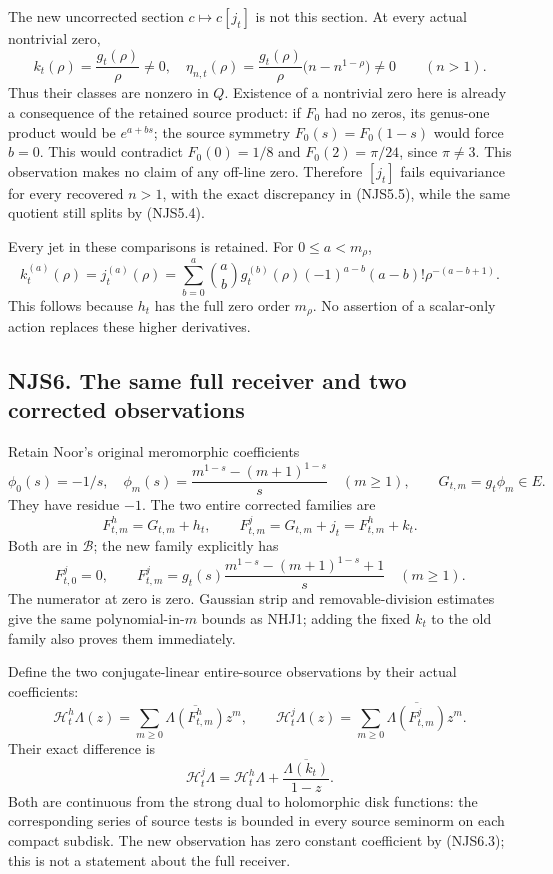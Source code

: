 The new uncorrected section \(c\mapsto c[j_t]\) is not this section. At
every actual nontrivial zero, \[
k_t(\rho)=\frac{g_t(\rho)}\rho\ne0,
\quad
\eta_{n,t}(\rho)=\frac{g_t(\rho)}\rho
\bigl(n-n^{1-\rho}\bigr)\ne0\qquad(n>1).
\tag{NJS5.5}
\] Thus their classes are nonzero in \(Q\). Existence of a nontrivial
zero here is already a consequence of the retained source product: if
\(F_0\) had no zeros, its genus-one product would be \(e^{a+bs}\); the
source symmetry \(F_0(s)=F_0(1-s)\) would force \(b=0\). This would
contradict \(F_0(0)=1/8\) and \(F_0(2)=\pi/24\), since \(\pi\ne3\). This
observation makes no claim of any off-line zero. Therefore \([j_t]\)
fails equivariance for every recovered \(n>1\), with the exact
discrepancy in (NJS5.5), while the same quotient still splits by
(NJS5.4).

Every jet in these comparisons is retained. For \(0\le a<m_\rho\), \[
k_t^{(a)}(\rho)=j_t^{(a)}(\rho)
=\sum_{b=0}^a\binom ab g_t^{(b)}(\rho)
(-1)^{a-b}(a-b)!\rho^{-(a-b+1)}.
\tag{NJS5.6}
\] This follows because \(h_t\) has the full zero order \(m_\rho\). No
assertion of a scalar-only action replaces these higher derivatives.

\subsection{NJS6. The same full receiver and two corrected
observations}\label{njs6.-the-same-full-receiver-and-two-corrected-observations}

Retain Noor's original meromorphic coefficients \[
\phi_0(s)=-1/s,\quad
\phi_m(s)=\frac{m^{1-s}-(m+1)^{1-s}}s\quad(m\ge1),
\qquad G_{t,m}=g_t\phi_m\in E.
\tag{NJS6.1}
\] They have residue \(-1\). The two entire corrected families are \[
F^h_{t,m}=G_{t,m}+h_t,
\qquad F^j_{t,m}=G_{t,m}+j_t=F^h_{t,m}+k_t.
\tag{NJS6.2}
\] Both are in \(\mathcal B\); the new family explicitly has \[
F^j_{t,0}=0,\qquad
F^j_{t,m}=g_t(s)\frac{m^{1-s}-(m+1)^{1-s}+1}s\quad(m\ge1).
\tag{NJS6.3}
\] The numerator at zero is zero. Gaussian strip and removable-division
estimates give the same polynomial-in-\(m\) bounds as NHJ1; adding the
fixed \(k_t\) to the old family also proves them immediately.

Define the two conjugate-linear entire-source observations by their
actual coefficients: \[
\mathcal H_t^h\Lambda(z)=\sum_{m\ge0}\overline{\Lambda(F^h_{t,m})}z^m,
\qquad\mathcal H_t^j\Lambda(z)=\sum_{m\ge0}\overline{\Lambda(F^j_{t,m})}z^m.
\] Their exact difference is \[
\boxed{\mathcal H_t^j\Lambda
=\mathcal H_t^h\Lambda+\frac{\overline{\Lambda(k_t)}}{1-z}.}
\tag{NJS6.4}
\] Both are continuous from the strong dual to holomorphic disk
functions: the corresponding series of source tests is bounded in every
source seminorm on each compact subdisk. The new observation has zero
constant coefficient by (NJS6.3); this is not a statement about the full
receiver.

